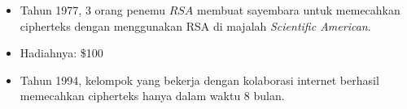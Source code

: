 \documentclass{article}
\begin{document}

\begin{itemize}
    \item Tahun 1977, 3 orang penemu $RSA$ membuat sayembara untuk memecahkan cipherteks dengan menggunakan RSA di majalah \textit{Scientific American}.
    \item Hadiahnya: \$100
    \item Tahun 1994, kelompok yang bekerja dengan kolaborasi internet berhasil memecahkan cipherteks hanya dalam waktu 8 bulan.
\end{itemize}
\end{document}

